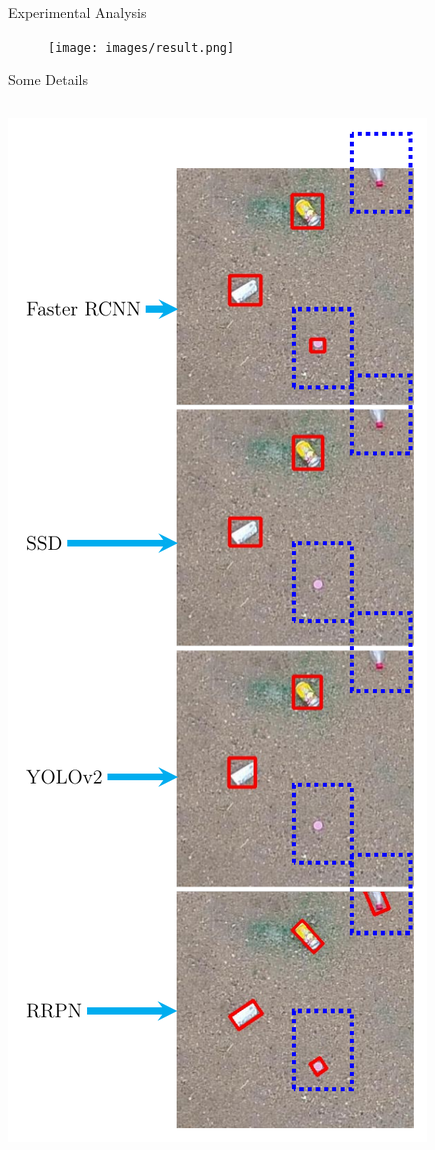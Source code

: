 \documentclass[newPxFont, fullfooter, sectionpages, progressbar]{beamer}
\begin{document}
\begin{frame}{Experimental Analysis}
	\begin{figure}
		\centering
	 	\texttt{[image: images/result.png]}
 	\end{figure}
\end{frame}

\begin{frame}{Some Details}
	\begin{columns}
		\begin{column}{.48\linewidth}
			\includegraphics[height=1.0\textheight]{images/results_room1.pdf}

\end{column}
\end{columns}
\end{frame}
\end{document}
